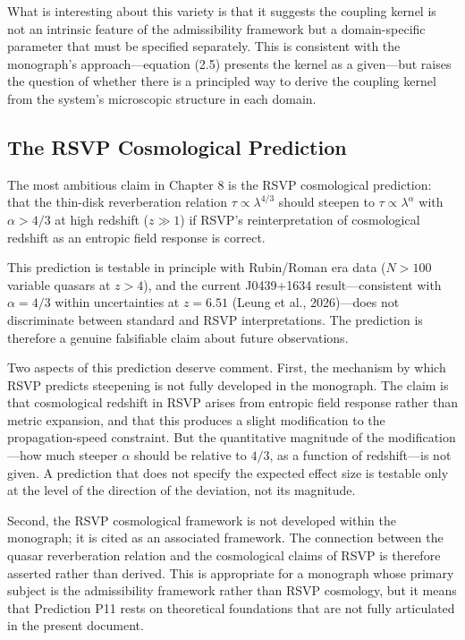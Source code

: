 \documentclass[12pt, a4paper]{article}
\theoremstyle{definition}
\begin{document}
What is interesting about this variety is that it suggests the coupling kernel is not an intrinsic feature of the admissibility framework but a domain-specific parameter that must be specified separately. This is consistent with the monograph's approach---equation (2.5) presents the kernel as a given---but raises the question of whether there is a principled way to derive the coupling kernel from the system's microscopic structure in each domain.

\subsection{The RSVP Cosmological Prediction}

The most ambitious claim in Chapter 8 is the RSVP cosmological prediction: that the thin-disk reverberation relation $\tau \propto \lambda^{4/3}$ should steepen to $\tau \propto \lambda^\alpha$ with $\alpha > 4/3$ at high redshift ($z \gg 1$) if RSVP's reinterpretation of cosmological redshift as an entropic field response is correct.

This prediction is testable in principle with Rubin/Roman era data ($N > 100$ variable quasars at $z > 4$), and the current J0439+1634 result---consistent with $\alpha = 4/3$ within uncertainties at $z = 6.51$ (Leung et al., 2026)---does not discriminate between standard and RSVP interpretations. The prediction is therefore a genuine falsifiable claim about future observations.

Two aspects of this prediction deserve comment. First, the mechanism by which RSVP predicts steepening is not fully developed in the monograph. The claim is that cosmological redshift in RSVP arises from entropic field response rather than metric expansion, and that this produces a slight modification to the propagation-speed constraint. But the quantitative magnitude of the modification---how much steeper $\alpha$ should be relative to $4/3$, as a function of redshift---is not given. A prediction that does not specify the expected effect size is testable only at the level of the direction of the deviation, not its magnitude.

Second, the RSVP cosmological framework is not developed within the monograph; it is cited as an associated framework. The connection between the quasar reverberation relation and the cosmological claims of RSVP is therefore asserted rather than derived. This is appropriate for a monograph whose primary subject is the admissibility framework rather than RSVP cosmology, but it means that Prediction P11 rests on theoretical foundations that are not fully articulated in the present document.
\end{document}
